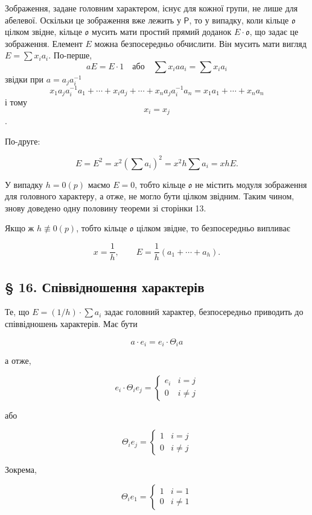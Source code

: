 \documentclass[11pt]{article}
\begin{document}
Зображення, задане головним характером, існує для кожної групи, не лише для абелевої. Оскільки це зображення вже лежить у \(\mathsf P\), то у випадку, коли кільце \(\mathfrak o\) цілком звідне, кільце \(\mathfrak o\) мусить мати простий прямий доданок \(E\cdot\mathfrak o\), що задає це зображення. Елемент \(E\) можна безпосередньо обчислити. Він мусить мати вигляд \(E=\sum x_i a_i\). По-перше,
\[
aE=E\cdot 1\quad\text{або}\quad \sum x_i a a_i=\sum x_i a_i
\]
звідки при \(a=a_j a_i^{-1}\)
\[
x_1a_ja_i^{-1}a_1+\cdots+x_i a_j+\cdots+x_na_ja_i^{-1}a_n
=x_1a_1+\cdots+x_na_n
\]
і тому
\[
x_i=x_j
\]
.

По-друге:

\[
E=E^2=x^2\left(\sum a_i\right)^2=x^2h\sum a_i=xhE.
\]

У випадку \(h=0(p)\) маємо \(E=0\), тобто кільце \(\mathfrak o\) не містить модуля зображення для головного характеру, а отже, не могло бути цілком звідним. Таким чином, знову доведено одну половину теореми зі сторінки 13.

Якщо ж \(h\not\equiv0(p)\), тобто кільце \(\mathfrak o\) цілком звідне, то безпосередньо випливає

\[
x=\frac{1}{h},\qquad E=\frac{1}{h}(a_1+\cdots+a_h).
\]

\subsection*{§ 16. Співвідношення характерів}\label{die-charakterenrelationen}

Те, що \(E=(1/h)\cdot\sum a_i\) задає головний характер, безпосередньо приводить до співвідношень характерів. Має бути

\[a \cdot e_i = e_i \cdot \Theta_i a\]

а отже,

\[e_i \cdot \Theta_i e_j = \begin{cases} e_i & i = j \\ 0 & i \neq j \end{cases}\]

або

\[\Theta_i e_j = \begin{cases} 1 & i = j \\ 0 & i \neq j \end{cases}\]

Зокрема,

\[\Theta_i e_1 = \begin{cases} 1 & i = 1 \\ 0 & i \neq 1 \end{cases}\]
\end{document}
